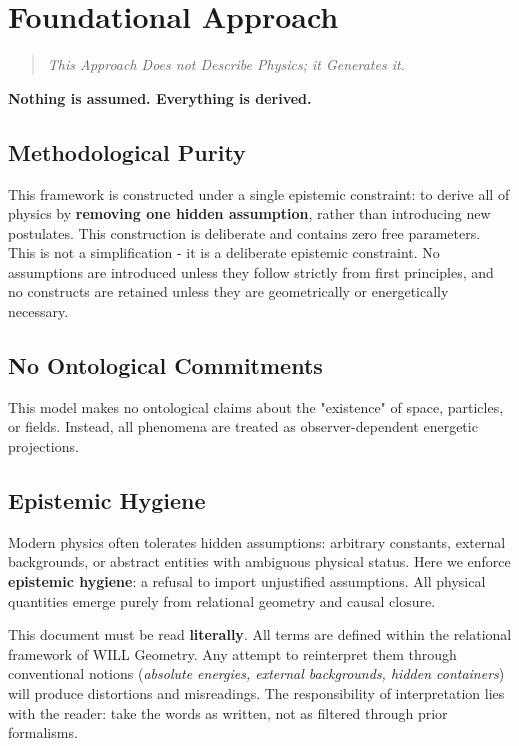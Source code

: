 \documentclass[12pt, a4paper]{article}
\begin{document}
\tableofcontents

\newpage



\section{Foundational Approach}
\begin{quote}
  \textit{This Approach Does not Describe Physics; it Generates it.}
\end{quote}

\begin{tcolorbox}[colback=gray!5, colframe=black!80!black, title=Guiding Principle:]
\textbf{Nothing is assumed. Everything is derived.}\\
\end{tcolorbox}

\subsection {Methodological Purity}
This framework is constructed under a single epistemic constraint: to derive all of physics by \textbf{removing one hidden assumption}, rather than introducing new postulates. This construction is deliberate and contains zero free parameters.  This is not a simplification - it is a deliberate epistemic constraint. No assumptions are introduced unless they follow strictly from first principles, and no constructs are retained unless they are geometrically or energetically necessary. 

\subsection*{No Ontological Commitments}
This model makes no ontological claims about the "existence" of space, particles, or fields. Instead, all phenomena are treated as observer-dependent energetic projections.

\subsection{Epistemic Hygiene}
Modern physics often tolerates hidden assumptions: arbitrary constants, external backgrounds, or abstract entities with ambiguous physical status. 
Here we enforce \textbf{epistemic hygiene}: a refusal to import unjustified assumptions. 
All physical quantities emerge purely from relational geometry and causal closure.

\begin{tcolorbox}[colback=gray!5, colframe=black!80!black, title=Epistemic Disclaimer]
This document must be read \textbf{literally}. 
All terms are defined within the relational framework of WILL Geometry. 
Any attempt to reinterpret them through conventional notions 
(\emph{absolute energies, external backgrounds, hidden containers}) 
will produce distortions and misreadings. 
The responsibility of interpretation lies with the reader: 
take the words as written, not as filtered through prior formalisms.
\end{tcolorbox}
\end{document}
